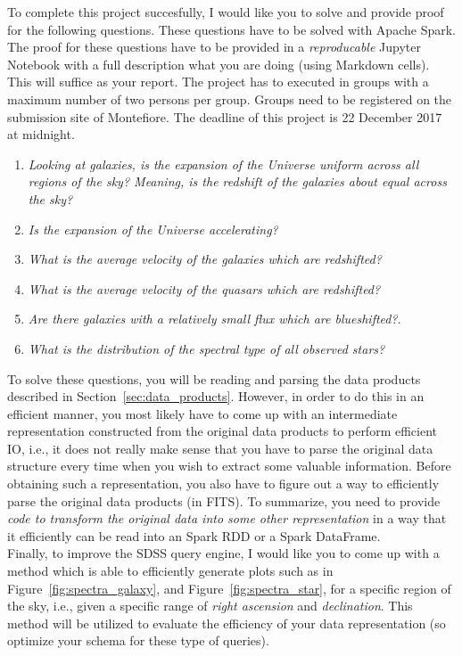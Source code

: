 To complete this project succesfully, I would like you to solve and provide proof for the following questions. These questions have to be solved with Apache Spark. The proof for these questions have to be provided in a \emph{reproducable} Jupyter Notebook with a full description what you are doing (using Markdown cells). This will suffice as your report. The project has to executed in groups with a maximum number of two persons per group. Groups need to be registered on the submission site of Montefiore. The deadline of this project is 22 December 2017 at midnight.

\begin{enumerate}
  \item \emph{Looking at galaxies, is the expansion of the Universe uniform across all regions of the sky? Meaning, is the redshift of the galaxies about equal across the sky?}
  \item \emph{Is the expansion of the Universe accelerating?}
  \item \emph{What is the average velocity of the galaxies which are redshifted?}
  \item \emph{What is the average velocity of the quasars which are redshifted?}
  \item \emph{Are there galaxies with a relatively small flux which are blueshifted?}.
  \item \emph{What is the distribution of the spectral type of all observed stars?}
\end{enumerate}

To solve these questions, you will be reading and parsing the data products described in Section~\ref{sec:data_products}. However, in order to do this in an efficient manner, you most likely have to come up with an intermediate representation constructed from the original data products to perform efficient IO, i.e., it does not really make sense that you have to parse the original data structure every time when you wish to extract some valuable information. Before obtaining such a representation, you also have to figure out a way to efficiently parse the original data products (in FITS). To summarize, you need to provide \emph{code to transform the original data into some other representation} in a way that it efficiently can be read into an Spark RDD or a Spark DataFrame.\\

Finally, to improve the SDSS query engine, I would like you to come up with a method which is able to efficiently generate plots such as in Figure~\ref{fig:spectra_galaxy}, and Figure~\ref{fig:spectra_star}, for a specific region of the sky, i.e., given a specific range of \emph{right ascension} and \emph{declination}. This method will be utilized to evaluate the efficiency of your data representation (so optimize your schema for these type of queries).

